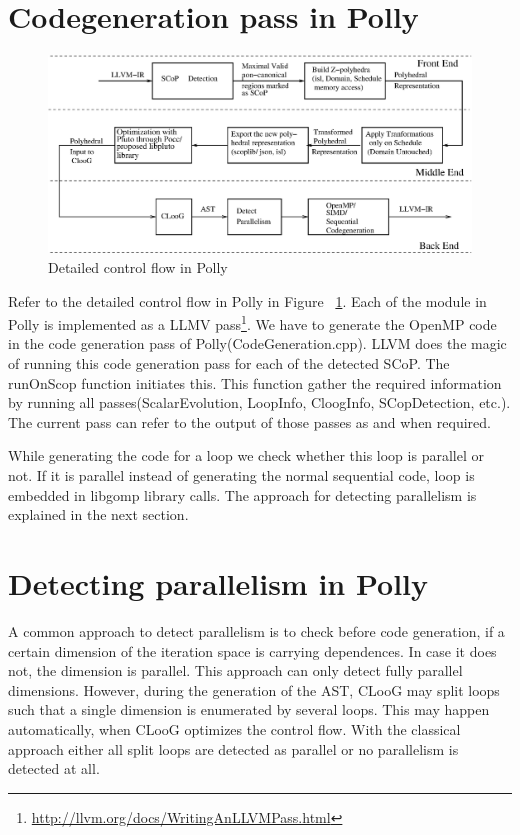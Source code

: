 \section{Codegeneration pass in Polly}
\begin{figure}
\begin{center}
  \includegraphics[width=1\textwidth]{images/detailedarch.eps}
  \caption{Detailed control flow in Polly}
  \label{detailed}
\end{center}
\end{figure}
Refer to the detailed control flow in Polly in Figure ~\ref{detailed}. Each of the module in Polly is
implemented as a LLMV pass\footnote{\url{http://llvm.org/docs/WritingAnLLVMPass.html}}. We have to generate the OpenMP code in the code 
generation pass of Polly(CodeGeneration.cpp). LLVM does the magic of running this code generation
pass for each of the detected SCoP. The runOnScop function initiates this. This function gather
the required information by running all passes(ScalarEvolution, LoopInfo, CloogInfo, SCopDetection, etc.).
The current pass can refer to the output of those passes as and when required. 

While generating the code for a loop we check whether this loop is parallel or not.  If it is
parallel instead of generating the normal sequential code,  loop is embedded in
libgomp library calls. The approach for detecting parallelism is explained in the next section.

\section{Detecting parallelism in Polly}

A common approach to detect
parallelism is to check before code generation, if a certain dimension of the
iteration space is carrying dependences. In case it does not, the dimension is
parallel.  This approach can only detect fully parallel dimensions. However,
during the generation of the AST, CLooG may split loops such that a
single dimension is enumerated by several loops.  This may happen
automatically, when CLooG optimizes the control flow.  With the classical
approach either all split loops are detected as parallel or no parallelism is
detected at all.

